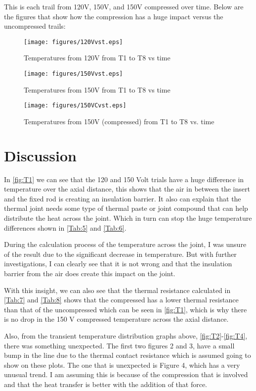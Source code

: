\documentclass[10pt,twocolumn]{article}
\begin{document}
This is each trail from 120V, 150V, and 150V compressed over time. Below are the figures that show how the compression has a huge impact versus the uncompressed trails:

\begin{figure}[H]
  \centering
  \texttt{[image: figures/120Vvst.eps]} 
  \caption{Temperatures from 120V from T1 to T8 vs time}
  \label{fig:T2}
\end{figure}

\begin{figure}[H]
  \centering
  \texttt{[image: figures/150Vvst.eps]} 
  \caption{Temperatures from 150V from T1 to T8 vs time}
  \label{fig:T3}
\end{figure}

\begin{figure}[H]
  \centering
  \texttt{[image: figures/150VCvst.eps]} 
  \caption{Temperatures from 150V (compressed) from T1 to T8 vs. time}
  \label{fig:T4}
\end{figure}


\section{Discussion}

In \autoref{fig:T1} we can see that the 120 and 150 Volt trials have a huge difference in temperature over the axial distance, this shows that the air in between the insert and the fixed rod is creating an insulation barrier. It also can explain that the thermal joint needs some type of thermal paste or joint compound that can help distribute the heat across the joint. Which in turn can stop the huge temperature differences shown in \autoref{Tab:5} and \autoref{Tab:6}. 

During the calculation process of the temperature across the joint, I was unsure of the result due to the significant decrease in temperature. But with further investigations, I can clearly see that it is not wrong and that the insulation barrier from the air does create this impact on the joint.

With this insight, we can also see that the thermal resistance calculated in \autoref{Tab:7} and \autoref{Tab:8} shows that the compressed has a lower thermal resistance than that of the uncompressed which can be seen in \autoref{fig:T1}, which is why there is no drop in the 150 V compressed temperature across the axial distance. 

Also, from the transient temperature distribution graphs above, \autoref{fig:T2}-\autoref{fig:T4}, there was something unexpected. The first two figures 2 and 3, have a small bump in the line due to the thermal contact resistance which is assumed going to show on these plots. The one that is unexpected is Figure 4, which has a very unusual trend. I am assuming this is because of the compression that is involved and that the heat transfer is better with the addition of that force. 
\end{document}
